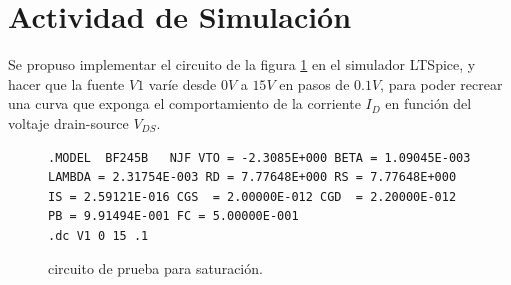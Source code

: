   \section{Actividad de Simulación}
    Se propuso implementar el circuito de la figura \ref{crkt:jfet-sat} en el simulador LTSpice, y hacer que la fuente
    $V1$ varíe desde $0V$ a $15V$ en pasos de $0.1V$, para poder recrear una curva que exponga el comportamiento de la
    corriente $I_D$ en función del voltaje drain-source $V_{DS}$.
    \begin{figure}[!ht]
      \centering
      \begin{minipage}{0.45\textwidth}
        \caption{circuito de prueba para saturación.}
        \label{crkt:jfet-sat}
      \end{minipage}
      \hfill
      \begin{minipage}{0.45\textwidth}
        \begin{lstlisting}[style=ltspice, caption={Parámetros de simulación LTspice}, label=list:jfet-sat]
.MODEL  BF245B   NJF VTO = -2.3085E+000 BETA = 1.09045E-003 LAMBDA = 2.31754E-003 RD = 7.77648E+000 RS = 7.77648E+000 IS = 2.59121E-016 CGS  = 2.00000E-012 CGD  = 2.20000E-012 PB = 9.91494E-001 FC = 5.00000E-001
.dc V1 0 15 .1
        \end{lstlisting}
      \end{minipage}
    \end{figure}

